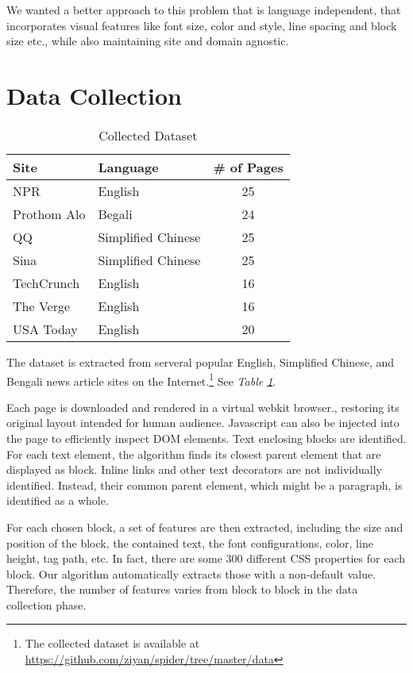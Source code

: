 \documentclass{acm_proc_article-sp}
\begin{document}
We wanted a better approach to this problem that is language independent, that incorporates visual features like font size, color and style, line spacing and block size etc., while also maintaining site and domain agnostic.

\newpage
\section{Data Collection}

\begin{table}
\centering
\caption{\label{table:dataset}Collected Dataset}
\begin{tabular}{|l|l|c|} \hline
Site&Language&\# of Pages\\ \hline\hline
NPR&English&25\\ \hline
Prothom Alo&Begali&24\\ \hline
QQ&Simplified Chinese&25\\ \hline
Sina&Simplified Chinese&25\\ \hline
TechCrunch&English&16\\ \hline
The Verge&English&16\\ \hline
USA Today&English&20\\ \hline
\end{tabular}
\end{table}

The dataset is extracted from serveral popular English, Simplified Chinese, and Bengali news article sites on the Internet.\footnote{The collected dataset is available at \url{https://github.com/ziyan/spider/tree/master/data}} See \emph{Table \ref{table:dataset}}.

Each page is downloaded and rendered in a virtual webkit browser.\cite{phantomjs}, restoring its original layout intended for human audience. Javascript can also be injected into the page to efficiently inspect DOM elements. Text enclosing blocks are identified. For each text element, the algorithm finds its closest parent element that are displayed as block. Inline links and other text decorators are not individually identified. Instead, their common parent element, which might be a paragraph, is identified as a whole.

For each chosen block, a set of features are then extracted, including the size and position of the block, the contained text, the font configurations, color, line height, tag path, etc. In fact, there are some 300 different CSS properties for each block. Our algorithm automatically extracts those with a non-default value. Therefore, the number of features varies from block to block in the data collection phase.
\end{document}
